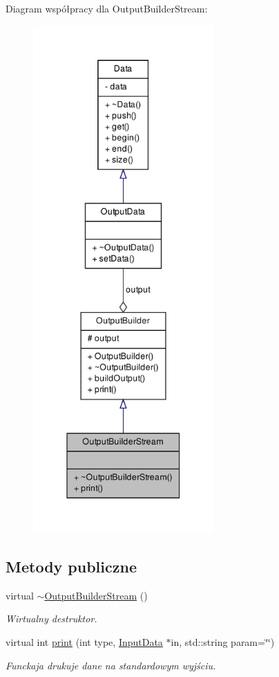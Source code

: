 \-Diagram współpracy dla \-Output\-Builder\-Stream\-:\nopagebreak
\begin{figure}[H]
\begin{center}
\leavevmode
\includegraphics[height=550pt]{class_output_builder_stream__coll__graph}
\end{center}
\end{figure}
\subsection*{\-Metody publiczne}
\begin{DoxyCompactItemize}
\item 
virtual \hyperlink{class_output_builder_stream_ab65353aa01cf8de7d6d4cbac29c93fa2}{$\sim$\-Output\-Builder\-Stream} ()
\begin{DoxyCompactList}\small\item\em \-Wirtualny destruktor. \end{DoxyCompactList}\item 
virtual int \hyperlink{class_output_builder_stream_a97a94cd7b144697ffbe0876da8e8e6db}{print} (int type, \hyperlink{class_input_data}{\-Input\-Data} $\ast$in, std\-::string param=\char`\"{}\char`\"{})
\begin{DoxyCompactList}\small\item\em \-Funckaja drukuje dane na standardowym wyjściu. \end{DoxyCompactList}\end{DoxyCompactItemize}



